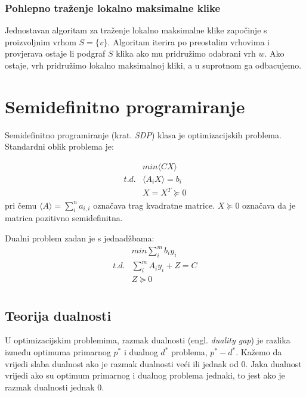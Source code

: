 \documentclass[diplomskirad]{fer}
\begin{document}
\subsection{Pohlepno traženje lokalno maksimalne klike}
\label{pog:greedy_clique}
Jednostavan algoritam za traženje lokalno maksimalne klike započinje s proizvoljnim vrhom $S = \{v\}$. Algoritam iterira po preostalim vrhovima i provjerava ostaje li
podgraf $S$ klika ako mu pridružimo odabrani vrh $w$. Ako ostaje, vrh pridružimo lokalno maksimalnoj kliki, a u suprotnom ga odbacujemo.

\chapter{Semidefinitno programiranje}
\label{pog:semidefinitno_programiranje}
Semidefinitno programiranje (krat. \textit{SDP}) klasa je optimizacijskih problema.
Standardni oblik problema je:

\begin{equation}
\begin{split}
  & min \langle CX \rangle \\
  t. d. & \langle A_iX \rangle = b_i \\
        & X = X^T \succeq 0
\end{split}
\end{equation}
pri čemu $ \langle A \rangle = \sum_{i}^{n} a_{i,i} $
označava trag kvadratne matrice. $X \succeq 0$ označava da je matrica pozitivno semidefinitna.

Dualni problem zadan je s jednadžbama: 
\begin{equation}
\begin{split}
  & min \sum_{i}^{m} b_iy_i \\
  t.d. & \sum_{i}^{m} A_iy_i + Z = C \\
      & Z \succeq 0 \\
\end{split}
\end{equation}


\section{Teorija dualnosti}
U optimizacijskim problemima, razmak dualnosti (engl. \textit{duality gap}) je razlika između optimuma primarnog $p^*$ i dualnog $d^*$ problema, $p^* - d^*$.
Kažemo da vrijedi slaba dualnost ako je razmak dualnosti veći ili jednak od 0. Jaka dualnost vrijedi ako su optimum primarnog i dualnog problema jednaki, to jest
ako je razmak dualnosti jednak 0. %
\end{document}
